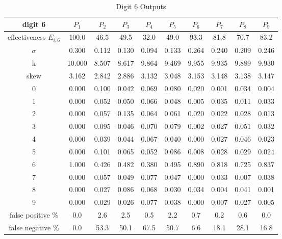 \documentclass[conference]{IEEEtran}
\begin{document}
\begin{table}
\caption{Digit 6 Outputs}
\centering\begin{tabular}{ | c ||  c | c | c | c | c | c | c | c | c |}
 digit 6 & $P_1$ & $P_2$ & $P_3$ & $P_4$ & $P_5$ & $P_6$ & $P_7$ & $P_8$ & $P_9$ \\
\hline \hline
effectiveness $E_{i,6}$  & 100.0 & 46.5 & 49.5 & 32.0 & 49.0 & 93.3 & 81.8 & 70.7 & 83.2 \\
\hline
$\sigma$ & 0.300& 0.112& 0.130& 0.094& 0.133& 0.264& 0.240& 0.209& 0.246 \\
\hline
k & 10.000& 8.507& 8.617& 9.864& 9.469& 9.955& 9.935& 9.889& 9.930 \\
\hline
skew & 3.162& 2.842& 2.886& 3.132& 3.048& 3.153& 3.148& 3.138& 3.147 \\
\hline
0 & 0.000 & 0.100 & 0.042 & 0.069 & 0.080 & 0.020 & 0.001 & 0.034 & 0.004 \\
\hline
1 & 0.000 & 0.052 & 0.050 & 0.066 & 0.048 & 0.005 & 0.035 & 0.011 & 0.033 \\
\hline
2 & 0.000 & 0.057 & 0.135 & 0.064 & 0.061 & 0.020 & 0.022 & 0.028 & 0.013 \\
\hline
3 & 0.000 & 0.095 & 0.046 & 0.070 & 0.079 & 0.002 & 0.027 & 0.051 & 0.032 \\
\hline
4 & 0.000 & 0.039 & 0.044 & 0.067 & 0.040 & 0.000 & 0.027 & 0.046 & 0.023 \\
\hline
5 & 0.000 & 0.101 & 0.065 & 0.052 & 0.086 & 0.008 & 0.028 & 0.029 & 0.024 \\
\hline
6 & 1.000 & 0.426 & 0.482 & 0.380 & 0.495 & 0.890 & 0.818 & 0.725 & 0.837 \\
\hline
7 & 0.000 & 0.057 & 0.049 & 0.077 & 0.047 & 0.000 & 0.033 & 0.007 & 0.038 \\
\hline
8 & 0.000 & 0.027 & 0.086 & 0.068 & 0.030 & 0.034 & 0.004 & 0.041 & 0.001 \\
\hline
9 & 0.000 & 0.029 & 0.026 & 0.077 & 0.038 & 0.000 & 0.007 & 0.027 & 0.005 \\
\hline
false positive \%  & 0.0 & 2.6 & 2.5 & 0.5 & 2.2 & 0.7 & 0.2 & 0.6 & 0.0 \\
\hline
false negative \%  & 0.0 & 53.3 & 50.1 & 67.5 & 50.7 & 6.6 & 18.1 & 28.1 & 16.8 \\
\hline
\end{tabular}
\label{table:digit6out}
\end{table}


{}
\end{document}

